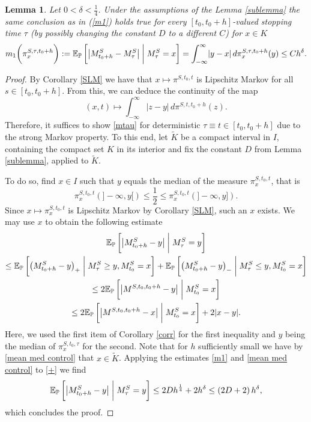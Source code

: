 \documentclass[11pt,a4paper]{article}%
\def\E{{\mathbb E}}
\def\P{{\mathbb P}}
\newtheorem{lemma}[theorem]{Lemma}
\numberwithin{equation}{section}
\begin{document}
\begin{lemma} \label{stop}
Let $0 < \delta < \frac{1}{4}$.
Under the assumptions of the Lemma \ref{sublemma} the same conclusion as in (\ref{m1}) holds true for every $[t_0,t_0+h]$-valued stopping time $\tau$ (by possibly changing the constant $D$ to a different $C$) for $x \in K$
\begin{equation} \label{mtau}
	m_1\biggl(\pi_x^{S ,\tau ,t_0 +h}\biggr) := \E_\P\left[\left|M^S_{t_0 +h} - M^S_{\tau}\right|  \biggm| M^S_{\tau}=x\right] 
	=\int_{-\infty}^\infty \lvert y-x\rvert \, d\pi_x^{S ,\tau ,t_0 +h}(y)
	\le C h^{\delta}.
\end{equation}
\end{lemma}

\begin{proof}
	By Corollary \ref{SLM} we have that $x \mapsto \pi^{S,t_0,t}$ is Lipschitz Markov for all $s \in [t_0,t_0+h]$.
	From this, we can deduce the continuity of the map
	\[
		(x,t) \mapsto \int_{-\infty}^{\infty} |z-y| \, d\pi^{S,t,t_0 + h}(z).
	\]
	Therefore, it suffices to show \eqref{mtau} for deterministic $\tau \equiv t \in [t_0,t_0 + h]$ due to the strong Markov property.
	To this end, let $\tilde K$ be a compact interval in $I$, containing the compact set $K$ in its interior and fix the constant $D$ from Lemma \ref{sublemma}, applied to $\tilde K$.

	To do so, find $x \in I$ such that $y$ equals the median of the measure $\pi_x^{S,t_0,t}$, that is
	\[ \pi^{S,t_0,t}_x(]-\infty, y[) \leq \frac{1}{2} \leq \pi^{S,t_0,t}_x(]-\infty, y]).  \]
	Since $x \mapsto \pi_x^{S,t_0,t}$ is Lipschitz Markov by Corollary \ref{SLM}, such an $x$ exists.
	We may use $x$ to obtain the following estimate
	\begin{multline}\label{+}
		\E_\P\left[\left|M^S_{t_0 +h} - y \right| \biggm| M^S_{\tau}=y\right] 
		\\ \le \E_\P\left[\left(M^S_{t_0 +h} - y\right)_+  \biggm| M^S_{\tau} \ge y, M^S_{t_0} = x\right] + \E_\P\left[\left(M^S_{t_0 +h} - y \right)_-  \biggm| M^S_{\tau} \le y, M^S_{t_0} = x\right]
		\\ \le 2 \E_\P\left[ \left| M^{S,t_0,t_0+h} - y \right| \biggm| M^{S}_{t_0} = x \right] \\ \le 2 \E_\P\left[ \left| M^{S,t_0,t_0+h} - x \right| \biggm| M^{S}_{t_0} = x \right] + 2|x - y|.
	\end{multline}
	Here, we used the first item of Corollary \ref{corr} for the first inequality and $y$ being the median of $\pi^{S,t_0,\tau}_x$ for the second.
	Note that for $h$ sufficiently small we have by \eqref{mean med control} that $x \in \tilde K$. 
	Applying the estimates \eqref{m1} and \eqref{mean med control} to \eqref{+} we find
\[
	\E_\P\left[\left|M^S_{t_0 +h} - y \right| \biggm| M^S_{\tau}=y\right] \le 2D h^\frac{1}{4} + 2h^\delta \leq \left( 2D + 2 \right) h^\delta,
\]
which concludes the proof.
\end{proof}
\end{document}
